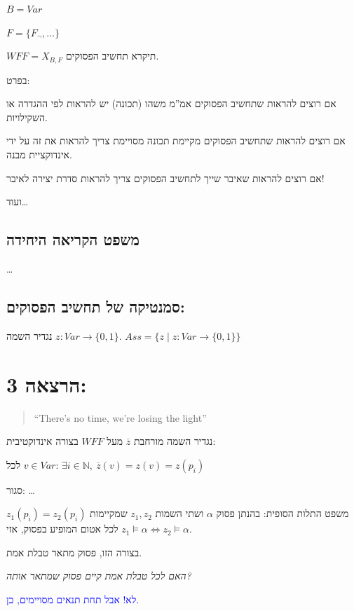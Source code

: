 \documentclass[12pt,a4paper]{article}
\begin{document}
$B=Var$

$F=\{F_{\lnot},\ldots\}$

$WFF=X_{B,F}$ תיקרא תחשיב הפסוקים.

בפרט:

אם רוצים להראות שתחשיב הפסוקים אמ''מ משהו (תכונה) יש להראות לפי ההגדרה או השקילויות.

אם רוצים להראות שתחשיב הפסוקים מקיימת תכונה מסויימת צריך להראות את זה על ידי אינדוקציית מבנה.

אם רוצים להראות שאיבר שייך לתחשיב הפסוקים צריך להראות סדרת יצירה לאיבר!

ועוד\ldots

\subsection*{משפט הקריאה היחידה}

\ldots

\subsection*{סמנטיקה של תחשיב הפסוקים:}

נגדיר השמה $z:Var\rightarrow\{0,1\}$.
$Ass=\{z \mid z:Var\rightarrow\{0,1\}\}$

\section*{הרצאה 3:}

\begin{quotation}
\textenglish{``There's no time, we're losing the light''}
\end{quotation}

נגדיר השמה מורחבת $\overline{z}$ מעל $WFF$ בצורה אינדוקטיבית:

לכל $v\in Var$: $\exists i\in\mathbb{N},\ \overline{z}(v)=z(v)=z(p_{i})$

סגור: \ldots

משפט התלות הסופית: בהנתן פסוק $\alpha$ ושתי השמות $z_{1},z_{2}$ שמקיימות $z_{1}(p_{i})=z_{2}(p_{i})$ לכל אטום המופיע בפסוק, אזי $z_{1}\vDash\alpha\iff z_{2}\vDash\alpha$.

בצורה הזו, פסוק מתאר טבלת אמת.

\emph{האם לכל טבלת אמת קיים פסוק שמתאר אותה?}

\textcolor{blue}{לא! אבל תחת תנאים מסויימים, כן.}
\end{document}
